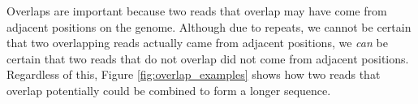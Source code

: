 \documentclass[12pt]{article}
\newcommand{\ReadArrowType}{latex}
\newcommand{\Figure}[1]{Figure \ref{#1}}
\begin{document}

Overlaps are important because two reads that overlap may have come from
adjacent positions on the genome.  Although due to repeats, we cannot be certain
that two overlapping reads actually came from adjacent positions, we {\em can}
be certain that two reads that do not overlap did not come from adjacent
positions.  Regardless of this, \Figure{fig:overlap_examples} shows how two
reads that overlap potentially could be combined to form a longer sequence.
\end{document}
